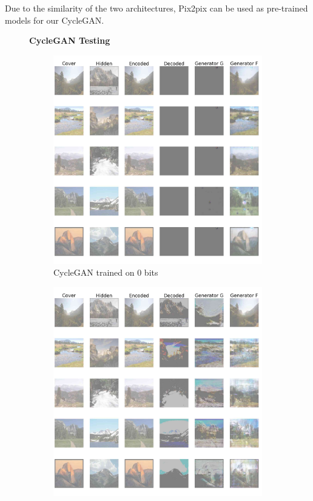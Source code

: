 \documentclass[conference]{IEEEtran}
\begin{document}
Due to the similarity of the two architectures, Pix2pix can be used as pre-trained models for our CycleGAN.

\begin{figure}[!hbt]
\centering
\textbf{CycleGAN Testing}\par\medskip
    \begin{subfigure}[b]{0.28\textwidth}
    \centering
            \includegraphics[scale=0.08]{images/cycle_sten_new_0.jpg}
            \caption{CycleGAN trained on 0 bits}
            \label{cycle_gan_new_0}
    \end{subfigure}
    \hspace{0.05\textwidth}
    \begin{subfigure}[b]{0.28\textwidth}
    \centering
            \includegraphics[scale=0.08]{images/cycle_sten_new_1.jpg}

\end{subfigure}
\end{figure}
\end{document}
